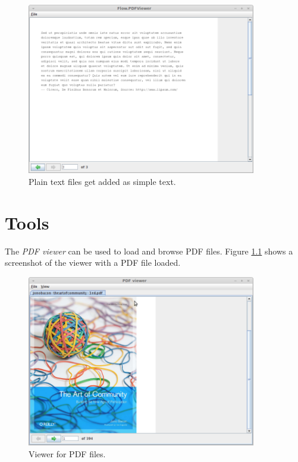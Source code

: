 \documentclass[a4paper]{book}
\begin{document}
\begin{figure}[htb]
  \centering
  \includegraphics[width=10.0cm]{images/pdf-create-output3.png}
  \caption{Plain text files get added as simple text.}
  \label{pdf-create-output3}
\end{figure}

\chapter{Tools}
The \textit{PDF viewer} can be used to load and browse PDF files. Figure 
\ref{pdf-viewer} shows a screenshot of the viewer with a PDF file loaded.

\begin{figure}[htb]
  \centering
  \includegraphics[width=10.0cm]{images/pdf-viewer.png}
  \caption{Viewer for PDF files.}
  \label{pdf-viewer}
\end{figure}

\end{document}
